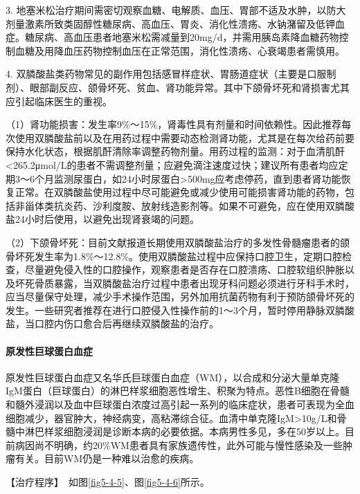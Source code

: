 3.
地塞米松治疗期间需密切观察血糖、电解质、血压、胃部不适及水肿，以防大剂量激素所致类固醇性糖尿病、高血压、胃炎、消化性溃疡、水钠潴留及低钾血症。糖尿病、高血压患者地塞米松需减量到20mg/d，并需用胰岛素降血糖药物控制血糖及用降血压药物控制血压在正常范围，消化性溃疡、心衰竭患者需慎用。

4.
双膦酸盐类药物常见的副作用包括感冒样症状、胃肠道症状（主要是口服制剂）、眼部副反应、颌骨坏死、贫血、肾功能异常。其中下颌骨坏死和肾损害尤其应引起临床医生的重视。

（1）肾功能损害：发生率9\%～15\%，肾毒性具有剂量和时间依赖性。因此推荐每次使用双膦酸盐前以及在用药过程中需要动态检测肾功能，尤其是在每次给药前要保持水化状态，根据肌酐清除率调整药物剂量。用药过程的监测：对于血清肌酐<265.2μmol/L的患者不需调整剂量；应避免滴注速度过快；建议所有患者均应定期3～6个月监测尿蛋白，如24小时尿蛋白\textgreater{}500mg应考虑停药，直到患者肾功能恢复正常。在双膦酸盐使用过程中尽可能避免或减少使用可能损害肾功能的药物，包括非甾体类抗炎药、沙利度胺、放射线造影剂等。如果不可避免，应在使用双膦酸盐24小时后使用，以避免出现肾衰竭的问题。

（2）下颌骨坏死：目前文献报道长期使用双膦酸盐治疗的多发性骨髓瘤患者的颌骨坏死发生率为1.8\%～12.8\%。使用双膦酸盐过程中应保持口腔卫生，定期口腔检查，尽量避免侵入性的口腔操作，观察患者是否存在口腔溃疡、口腔软组织肿胀以及坏死骨质暴露，当双膦酸盐治疗过程中患者出现牙科问题必须进行牙科手术时，应当尽量保守处理，减少手术操作范围，另外加用抗菌药物有利于预防颌骨坏死的发生。一些研究者推荐在进行口腔侵入性操作前的1～3个月，暂时停用静脉双膦酸盐，当口腔内伤口愈合后再继续双膦酸盐的治疗。

\paragraph{原发性巨球蛋白血症}

原发性巨球蛋白血症又名华氏巨球蛋白血症（WM），以合成和分泌大量单克隆IgM蛋白（巨球蛋白）的淋巴样浆细胞恶性增生、积聚为特点。恶性B细胞在骨髓和髓外浸润以及血中巨球蛋白浓度过高引起一系列的临床症状，患者可表现为全血细胞减少，器官肿大，神经病变，高粘滞综合征。血清中单克隆IgM\textgreater{}10g/L和骨髓中淋巴样浆细胞浸润是诊断本病的必要依据。本病男性多见，多在50岁以上。目前病因尚不明确，约20\%WM患者具有家族遗传性，此外可能与慢性感染及一些肿瘤有关。目前WM仍是一种难以治愈的疾病。

【治疗程序】　如图\ref{fig5-4-5}、图\ref{fig5-4-6}所示。

